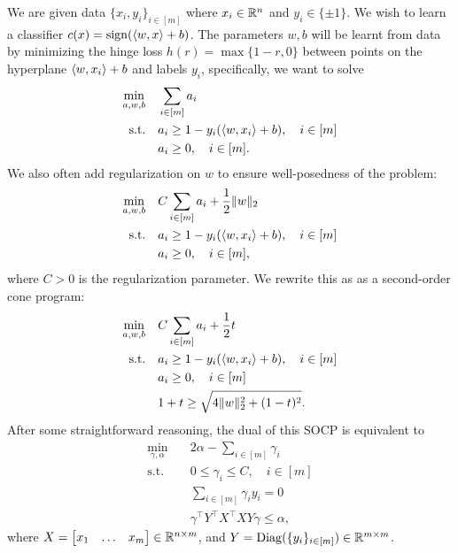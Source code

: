 \documentclass[11pt,oneside]{article}
\theoremstyle{plain}
\theoremstyle{definition}
\theoremstyle{remark}
\begin{document}
We are given data $\{x_i,y_i\}_{i \in [m]}$ where $x_i \in \mathbb{R}^n$ and $y_i \in \{\pm 1\}$. We wish to learn a classifier $c(x) = \operatorname{sign}(\langle w,x \rangle + b)$. The parameters $w,b$ will be learnt from data by minimizing the hinge loss $h(r) = \max\{1-r,0\}$ between points on the hyperplane $\langle w,x_i \rangle + b$ and labels $y_i$, specifically, we want to solve
\begin{align*}
\min_{a,w,b} &\quad \sum_{i \in [m]} a_i\\
\text{s.t.} &\quad a_i \geq 1 - y_i(\langle w,x_i \rangle + b), \quad i \in [m]\\
&\quad a_i \geq 0, \quad i \in [m].
\end{align*}
We also often add regularization on $w$ to ensure well-posedness of the problem:
\begin{align*}
\min_{a,w,b} &\quad C \sum_{i \in [m]} a_i + \frac{1}{2} \|w\|_2\\
\text{s.t.} &\quad a_i \geq 1 - y_i(\langle w,x_i \rangle + b), \quad i \in [m]\\
&\quad a_i \geq 0, \quad i \in [m],
\end{align*}
where $C > 0$ is the regularization parameter. We rewrite this as as a second-order cone program:
\begin{align*}
\min_{a,w,b} &\quad C \sum_{i \in [m]} a_i + \frac{1}{2} t\\
\text{s.t.} &\quad a_i \geq 1 - y_i(\langle w,x_i \rangle + b), \quad i \in [m]\\
&\quad a_i \geq 0, \quad i \in [m]\\
&\quad 1+t \geq \sqrt{4 \|w\|_2^2 + (1-t)^2}.
\end{align*}
After some straightforward reasoning, the dual of this SOCP is equivalent to
\begin{align*}
\min_{\gamma,\alpha} &\quad 2 \alpha - \sum_{i \in [m]} \gamma_i\\
\text{s.t.} &\quad 0 \leq \gamma_i \leq C, \quad i \in [m]\\
&\quad \sum_{i \in [m]} \gamma_i y_i = 0\\
&\quad \gamma^\top Y^\top X^\top X Y \gamma \leq \alpha,
\end{align*}
where $X = \begin{bmatrix} x_1 & \ldots & x_m \end{bmatrix} \in \mathbb{R}^{n \times m}$, and $Y = \operatorname{Diag}(\{y_i\}_{i \in [m]}) \in \mathbb{R}^{m \times m}$.
\end{document}
